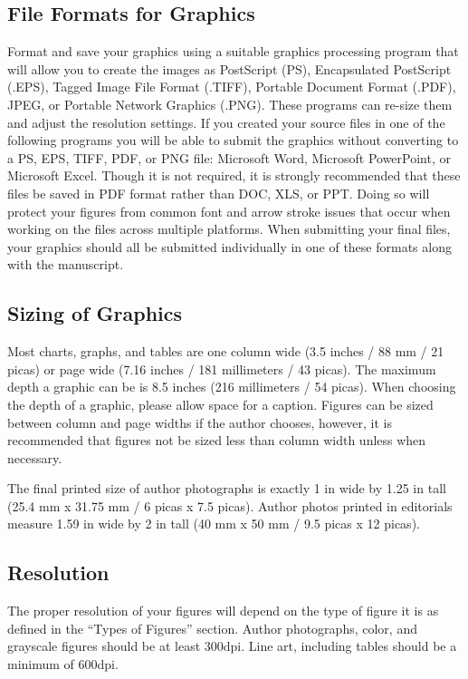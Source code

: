 \documentclass[letter]{IEEEtaes}
\begin{document}
\subsection{File Formats for Graphics}

Format and save your graphics using a suitable graphics processing program that will allow you to create the images as PostScript (PS), Encapsulated PostScript (.EPS), Tagged Image File Format (.TIFF), Portable Document Format (.PDF), JPEG, or Portable Network Graphics (.PNG). These programs can re-size them and adjust the resolution settings. If you created your source files in one of the following programs you will be able to submit the graphics without converting to a PS, EPS, TIFF, PDF, or PNG file: Microsoft Word, Microsoft PowerPoint, or Microsoft Excel. Though it is not required, it is strongly recommended that these files be saved in PDF format rather than DOC, XLS, or PPT. Doing so will protect your figures from common font and arrow stroke issues that occur when working on the files across multiple platforms. When submitting your final files, your graphics should all be submitted individually in one of these formats along with the manuscript.

\subsection{Sizing of Graphics}

Most charts, graphs, and tables are one column wide (3.5 inches / 88 mm / 21 picas) or page wide (7.16 inches / 181 millimeters / 43 picas). The maximum depth a graphic can be is 8.5 inches (216 millimeters / 54 picas). When choosing the depth of a graphic, please allow space for a caption. Figures can be sized between column and page widths if the author chooses, however, it is recommended that figures not be sized less than column width unless when necessary.

The final printed size of author photographs is exactly 1 in wide by 1.25 in tall (25.4 mm x 31.75 mm / 6 picas x 7.5 picas). Author photos printed in editorials measure 1.59 in wide by 2 in tall (40 mm x 50 mm / 9.5 picas x 12 picas).

\subsection{Resolution}

The proper resolution of your figures will depend on the type of figure it is as defined in the ``Types of Figures'' section. Author photographs, color, and grayscale figures should be at least 300dpi. Line art, including tables should be a minimum of 600dpi.
\end{document}
